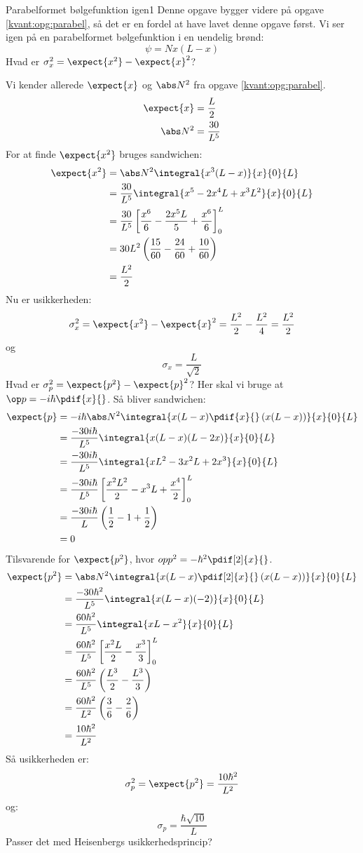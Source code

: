 \begin{opgave}{Parabelformet bølgefunktion igen}{1}
Denne opgave bygger videre på opgave \ref{kvant:opg:parabel}, så det er en fordel at have lavet denne opgave først. Vi ser igen på en parabelformet bølgefunktion i en uendelig brønd:
$$
\psi=Nx(L-x)
$$
\opg Hvad er $\sigma_x^2 = \expect{x^2}-\expect{x}^2$?

Vi kender allerede $\expect{x}$ og $\abs N^2$ fra opgave \ref{kvant:opg:parabel}.
\begin{align*}
\expect{x} &= \frac{L}{2}\\
\abs N^2 &= \frac{30}{L^5}
\end{align*}
For at finde $\expect{x^2}$ bruges sandwichen:
\begin{align*}
    \expect{x^2}&= \abs N^2 \integral{x^3(L-x)}{x}{0}{L}\\
    &= \frac{30}{L^5}\integral{x^5-2x^4L+x^3L^2}{x}{0}{L}\\
    &= \frac{30}{L^5}\left[\frac{x^6}{6}-\frac{2x^5L}{5}+\frac{x^6}{6}\right]_0^L\\
    &= 30 L^2\left(\frac{15}{60}-\frac{24}{60}+\frac{10}{60}\right)\\
    &= \frac{L^2}{2}
\end{align*}
Nu er usikkerheden:
$$
\sigma_x^2 = \expect{x^2}-\expect{x}^2 = \frac{L^2}{2}-\frac{L^2}{4}=\frac{L^2}{2}
$$
og
$$
\sigma_x = \frac{L}{\sqrt{2}}
$$
\opg Hvad er $\sigma_p^2 = \expect{p^2}-\expect{p}^2$?
Her skal vi bruge at $\op p = -i\hbar\pdif{x}{}$. Så bliver sandwichen:
\begin{align*}
    \expect{p} &= -i\hbar\abs N^2\integral{x(L-x)\pdif{x}{}\left(x(L-x)\right)}{x}{0}{L}\\
    &= \frac{-30i\hbar }{L^5}\integral{x(L-x)(L-2x)}{x}{0}{L}\\
    &= \frac{-30i\hbar }{L^5}\integral{xL^2-3x^2L+2x^3}{x}{0}{L}\\
    &= \frac{-30i\hbar }{L^5}\left[\frac{x^2L^2}{2}-x^3L+\frac{x^4}{2}\right]_0^L\\
    &= \frac{-30i\hbar }{L} \left(\frac{1}{2}-1+\frac{1}{2}\right)\\
    &=0
\end{align*}
Tilsvarende for $\expect{p^2}$, hvor $op p^2 = -\hbar^2\pdif[2]{x}{}$.
\begin{align*}
    \expect{p^2} &= \abs N^2 \integral{x(L-x)\pdif[2]{x}{}\left(x(L-x)\right)}{x}{0}{L}\\
    &= \frac{-30\hbar^2 }{L^5}\integral{x(L-x)(-2)}{x}{0}{L}\\
    &= \frac{60\hbar^2}{L^5}\integral{xL-x^2}{x}{0}{L}\\
    &= \frac{60\hbar^2}{L^5}\left[\frac{x^2L}{2}-\frac{x^3}{3}\right]_0^L\\
    &= \frac{60\hbar^2}{L^5}\left(\frac{L^3}{2}-\frac{L^3}{3}\right)\\
    &= \frac{60\hbar^2}{L^2}\left(\frac{3}{6}-\frac{2}{6}\right)\\
    &= \frac{10\hbar^2}{L^2}
\end{align*}
Så usikkerheden er:
$$
\sigma_p^2 = \expect{p^2} = \frac{10\hbar^2}{L^2}
$$
og:
$$
\sigma_p = \frac{\hbar\sqrt{10}}{L}
$$
\opg Passer det med Heisenbergs usikkerhedsprincip?


\end{opgave}
